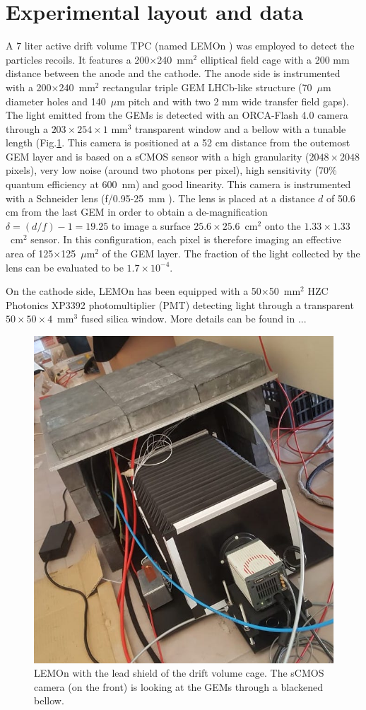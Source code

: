 \documentclass[12pt]{iopart}
\begin{document}
 \section{Experimental layout and data }
 A 7 liter active drift volume TPC  (named LEMOn  \cite{paperBTF} ) was employed to detect the particles recoils. It 
features   a  200$\times$240~mm$^2$ elliptical field cage with a 200 mm distance between the anode and the cathode. The anode side is instrumented with a 200$\times$240~mm$^2$ rectangular triple  GEM  LHCb-like \cite{bib:thesis}  structure  (70~$\mu$m diameter holes and 140~$\mu$m pitch   and  with two 2 mm wide  transfer  field gaps). The light emitted from the GEMs is detected with   an ORCA-Flash 4.0 camera \cite{ORCAcamera} through a  $203\times254\times1$ mm$^3$ transparent window and a  bellow with a tunable length (Fig.\ref{fig:LemonShielded}.  This camera is positioned  at a 52 cm  distance from the outemost  GEM layer and is based on a sCMOS sensor with a high granularity ($2048\times2048$ pixels), very low noise (around two photons per pixel), high sensitivity (70\%  quantum efficiency at  600~nm) and good linearity. This camera is instrumented with a Schneider lens (f/0.95-25~mm ). The lens is placed at a distance $d$ of 50.6 cm from the last GEM
in order to obtain a de-magnification
$\delta = (d/f) - 1 = 19.25$ to
image a surface $25.6 \times 25.6$~cm$^2$ onto the
$1.33 \times 1.33$~cm$^2$ sensor.
In this configuration, each pixel
 is therefore imaging  an effective area of 125$\times$125~$\mu$m$^2$ of the GEM layer. The fraction of the light collected by the lens can be evaluated \cite{bib:jinst_orange1} to be $1.7 \times 10^{-4}$.



On the cathode side, LEMOn has been equipped with a 50$\times$50~mm$^2$ HZC Photonics XP3392 photomultiplier \cite{PMTPhotonics} (PMT) detecting light through a transparent $50\times50\times4$~mm$^3$ fused silica window. More details can be found in ...


 
\begin{figure}[ht]
	\centering
	\includegraphics[width=0.45\linewidth]{LEMON-Shielded.jpg}
  	\caption{LEMOn with the lead shield of the  drift volume cage. The sCMOS camera (on the front) is looking at the GEMs through a blackened bellow.}
  	\label{fig:LemonShielded}
\end{figure}
\end{document}

